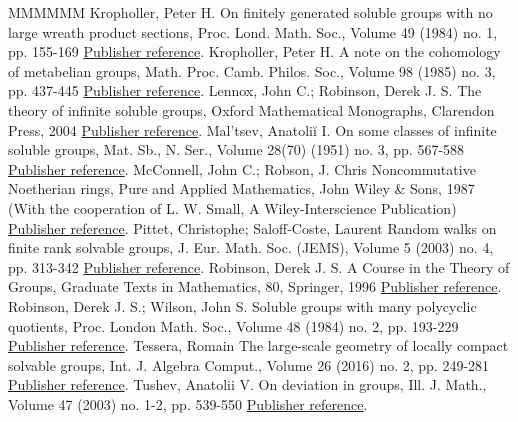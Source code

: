 \documentclass[11pt]{article}
\theoremstyle{definition}
\numberwithin{equation}{section}
\numberwithin{figure}{section}
\numberwithin{table}{section}
\begin{document}
\begin{thebibliography}{MMMMMM}
 Kropholler, Peter H. On finitely generated soluble groups with no large wreath product sections, Proc. Lond. Math. Soc., Volume 49 (1984) no. 1, pp. 155-169 \href{https://ahl.centre-mersenne.org/item/AHL_2020__3__981_0/#K84}{Publisher reference}.
 Kropholler, Peter H. A note on the cohomology of metabelian groups, Math. Proc. Camb. Philos. Soc., Volume 98 (1985) no. 3, pp. 437-445 \href{https://ahl.centre-mersenne.org/item/AHL_2020__3__981_0/#K2}{Publisher reference}.
 Lennox, John C.; Robinson, Derek J. S. The theory of infinite soluble groups, Oxford Mathematical Monographs, Clarendon Press, 2004 \href{https://ahl.centre-mersenne.org/item/AHL_2020__3__981_0/#LennoxRobinson}{Publisher reference}.
 Mal’tsev, Anatoliĭ I. On some classes of infinite soluble groups, Mat. Sb., N. Ser., Volume 28(70) (1951) no. 3, pp. 567-588 \href{https://ahl.centre-mersenne.org/item/AHL_2020__3__981_0/#Mal51}{Publisher reference}.
 McConnell, John C.; Robson, J. Chris Noncommutative Noetherian rings, Pure and Applied Mathematics, John Wiley \& Sons, 1987 (With the cooperation of L. W. Small, A Wiley-Interscience Publication) \href{https://ahl.centre-mersenne.org/item/AHL_2020__3__981_0/#MR}{Publisher reference}.
 Pittet, Christophe; Saloff-Coste, Laurent Random walks on finite rank solvable groups, J. Eur. Math. Soc. (JEMS), Volume 5 (2003) no. 4, pp. 313-342 \href{https://ahl.centre-mersenne.org/item/AHL_2020__3__981_0/#PSC03}{Publisher reference}.
 Robinson, Derek J. S. A Course in the Theory of Groups, Graduate Texts in Mathematics, 80, Springer, 1996 \href{https://ahl.centre-mersenne.org/item/AHL_2020__3__981_0/#Rob96}{Publisher reference}.
 Robinson, Derek J. S.; Wilson, John S. Soluble groups with many polycyclic quotients, Proc. London Math. Soc., Volume 48 (1984) no. 2, pp. 193-229 \href{https://ahl.centre-mersenne.org/item/AHL_2020__3__981_0/#RW}{Publisher reference}.
 Tessera, Romain The large-scale geometry of locally compact solvable groups, Int. J. Algebra Comput., Volume 26 (2016) no. 2, pp. 249-281 \href{https://ahl.centre-mersenne.org/item/AHL_2020__3__981_0/#Tsurvey}{Publisher reference}.
 Tushev, Anatolii V. On deviation in groups, Ill. J. Math., Volume 47 (2003) no. 1-2, pp. 539-550 \href{https://ahl.centre-mersenne.org/item/AHL_2020__3__981_0/#Tus}{Publisher reference}.
\end{thebibliography}
\end{document}
